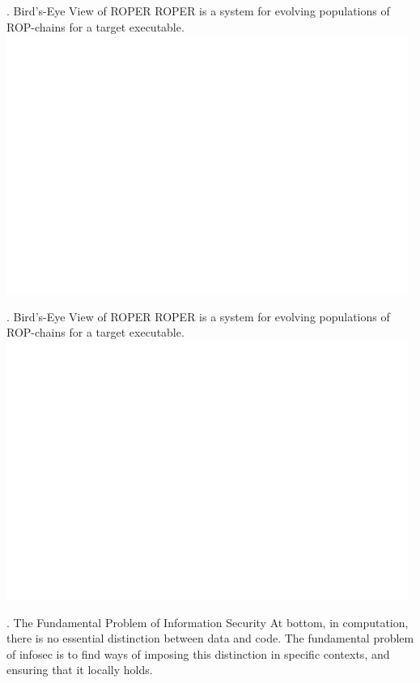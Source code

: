 \documentclass[9pt]{beamer}
\begin{document}
\begin{frame}{\theframenumber. Bird's-Eye View of ROPER}
  ROPER is a system for evolving populations of ROP-chains for a target executable. 
      \includegraphics[width=\textwidth]{../images/architecture-transparent.png}
\end{frame}

\begin{frame}{\theframenumber. Bird's-Eye View of ROPER}
  ROPER is a system for evolving populations of ROP-chains for a target executable. 
      \includegraphics[width=\textwidth]{../images/architecture-transparent-gadget-extraction.png}
\end{frame}


\begin{frame}{\theframenumber. The Fundamental Problem of Information Security}
  At bottom, in computation, there is no essential distinction between data and
  code. The fundamental problem of infosec is to find ways of imposing this
  distinction in specific contexts, and ensuring that it locally holds. 
\end{frame}
\end{document}

